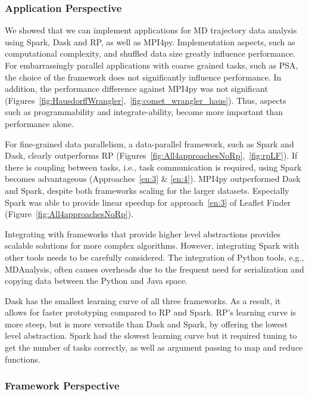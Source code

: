 \subsubsection*{Application Perspective}

We showed that we can implement applications for MD trajectory data analysis
using Spark, Dask and RP, as well as MPI4py. Implementation aspects,
such as computational complexity, and shuffled data size greatly influence
performance. For embarrassingly parallel applications with coarse grained tasks,
such as PSA, the choice of the framework does not significantly influence
performance. In addition, the performance difference against MPI4py was not
significant
(Figures~\ref{fig:HausdorffWrangler},~\ref{fig:comet_wrangler_haus}). Thus,
aspects such as programmability and integrate-ability, become more important
than performance alone.

For fine-grained data parallelism, a data-parallel framework, such as Spark and
Dask, clearly outperforms RP
(Figures~\ref{fig:All4approachesNoRp},~\ref{fig:rpLF}). If there is coupling 
between tasks, i.e., task communication is required, using Spark becomes
advantageous (Approaches~\ref{en:3} \& \ref{en:4}). MPI4py outperformed
Dask and Spark, despite both frameworks scaling for the larger datasets.
Especially Spark was able to provide linear speedup for approach~\ref{en:3} of
Leaflet Finder (Figure~\ref{fig:All4approachesNoRp}).

Integrating with frameworks that provide higher level abstractions provides
scalable solutions for more complex algorithms. However, integrating Spark with
other tools needs to be carefully considered. The integration of Python tools,
e.g., MDAnalysis, often causes overheads due to the frequent need for
serialization and copying data between the Python and Java space.

Dask has the smallest learning curve of all three frameworks. As a result, it
allows for faster prototyping compared to RP and Spark.
RP's learning curve is more steep, but is more versatile than Dask
and Spark, by offering the lowest level abstraction. Spark had the slowest
learning curve but it required tuning to get the number of tasks correctly, as
well as argument passing to map and reduce functions.

\subsubsection*{Framework Perspective}

